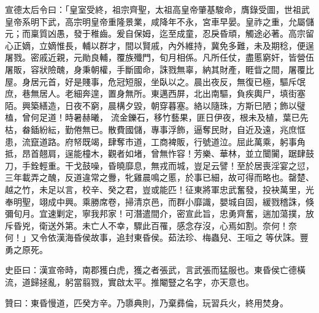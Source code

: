 \begin{pinyinscope}
 宣德太后令曰：「皇室受終，祖宗齊聖，太祖高皇帝肇基駿命，膺錄受圖，世祖武皇帝系明下武，高宗明皇帝重隆景業，咸降年不永，宮車早晏。皇祚之重，允屬儲元；而稟質凶愚，發于稚齒。爰自保姆，迄至成童，忍戾昏頑，觸途必著。高宗留心正嫡，立嫡惟長，輔以群才，間以賢戚，內外維持，冀免多難，未及期稔，便逞屠戮。密戚近親，元勛良輔，覆族殲門，旬月相係。凡所任仗，盡慝窮奸，皆營伍屠販，容狀險醜，身秉朝權，手斷國命，誅戮無辜，納其財產，睚眥之間，屠覆比屋。身居元首，好是賤事，危冠短服，坐臥以之。晨出夜反，無復已極，驅斥氓庶，巷無居人。老細奔遑，置身無所。東邁西屏，北出南驅，負疾輿尸，填街塞陌。興築繕造，日夜不窮，晨構夕毀，朝穿暮塞。絡以隨珠，方斯巳陋；飾以璧榼，曾何足道！時暑赫曦，
 流金鑠石，移竹藝果，匪日伊夜，根未及植，葉已先枯，畚鍤紛紜，勤倦無已。散費國儲，專事浮飾，逼奪民財，自近及遠，兆庶恇患，流竄道路。府帑既竭，肆奪市道，工商裨販，行號道泣。屈此萬乘，躬事角抵，昂首翹肩，逞能橦木，觀者如堵，曾無怍容！芳樂、華林，並立闤闠，踞肆鼓刀，手銓輕重。干戈鼓噪，昏曉靡息，無戎而城，豈足云譬！至於居喪淫宴之愆，三年載弄之醜，反道違常之釁，牝雞晨鳴之慝，於事已細，故可得而略也。罄楚、越之竹，未足以言，校辛、癸之君，豈或能匹！征東將軍忠武奮發，投袂萬里，光奉明聖，翊成中興。乘勝席卷，掃清京邑，而群小靡識，嬰城自固，緩戮稽誅，倏彌旬月。宜速剿定，寧我邦家！可潛遣間介，密宣此旨，忠勇齊奮，遄加蕩撲，放斥昏兇，衛送外第。未亡人不幸，驟此百罹，感念存沒，心焉如割。奈何！奈何！」又令依漢海昏侯故事，追封東昏侯。茹法珍、梅蟲兒、王咺之
 等伏誅。豐勇之原死。



 史臣曰：漢宣帝時，南郡獲白虎，獲之者張武，言武張而猛服也。東昏侯亡德橫流，道歸拯亂，躬當翦戮，實啟太平。推閹豎之名字，亦天意也。



 贊曰：東昏慢道，匹癸方辛。乃隳典則，乃棄彞倫，玩習兵火，終用焚身。



\end{pinyinscope}